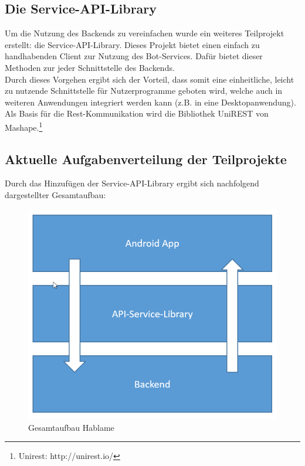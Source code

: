 \subsection{Die Service-API-Library}
Um die Nutzung des Backends zu vereinfachen wurde ein weiteres Teilprojekt erstellt: die Service-API-Library. Dieses Projekt bietet einen einfach zu handhabenden Client zur Nutzung des Bot-Services. Dafür bietet dieser Methoden zur jeder Schnittstelle des Backends.\\
Durch dieses Vorgehen ergibt sich der Vorteil, dass somit eine einheitliche, leicht zu nutzende Schnittstelle für Nutzerprogramme geboten wird, welche auch in weiteren Anwendungen integriert werden kann (z.B. in eine Desktopanwendung).\\
Als Basis für die Rest-Kommunikation wird die Bibliothek UniREST von Mashape.\footnote{Unirest: http://unirest.io/}

\subsection{Aktuelle Aufgabenverteilung der Teilprojekte}
Durch das Hinzufügen der Service-API-Library ergibt sich nachfolgend dargestellter Gesamtaufbau:

\begin{figure}[h]
\centering
\includegraphics[width=0.7\linewidth]{ks/graphics/arch.png}
\caption{Gesamtaufbau Hablame}
\label{fig:arch}
\end{figure}

